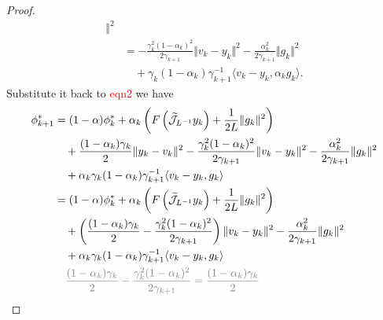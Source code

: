 \documentclass[12pt]{article}
\begin{document}
\begin{proof}
\begin{align*}
            \Vert^2
            \\
            &= 
            -\frac{\gamma_k^2 (1 - \alpha_k)^2}{2 \gamma_{k + 1}} 
            \Vert v_k - y_k\Vert^2 - 
            \frac{\alpha_k^2}{2 \gamma_{k + 1}} \Vert g_k\Vert^2
            \\&\quad 
                + 
                \gamma_k(1 - \alpha_k)\gamma_{k + 1}^{-1} \langle v_k - y_k, \alpha_k g_k\rangle. 
        \end{align*}
        Substitute it back to \textcolor{red}{eqn2} we have 
        \begin{align*}
            \phi_{k + 1}^* &= 
            (1 - \alpha)\phi_k^* + 
            \alpha_k
            \left(
                F\left(\widetilde{\mathcal J}_{L^{-1}} y_k\right) + 
                \frac{1}{2L}\Vert g_k\Vert^2
            \right)
            \\
            &\quad 
            + \frac{(1 - \alpha_k)\gamma_k}{2}\Vert y_k - v_k\Vert^2
            - \frac{\gamma_k^2(1 - \alpha_k)^2}{2\gamma_{k + 1}}\Vert v_k - y_k\Vert^2
            - \frac{\alpha_k^2}{2\gamma_{k + 1}}\Vert g_k\Vert^2
            \\
            &\quad 
            + \alpha_k\gamma_k(1 - \alpha_k)\gamma_{k + 1}^{-1}\langle v_k -y_k, g_k\rangle
            \\
            &= 
                (1 - \alpha)\phi_k^* + 
                \alpha_k
                \left(
                    F\left(\widetilde{\mathcal J}_{L^{-1}} y_k\right) + 
                    \frac{1}{2L}\Vert g_k\Vert^2
                \right)
                \\
                &\quad 
                + 
                \left(
                    \frac{(1 - \alpha_k)\gamma_k}{2}
                    - 
                    \frac{\gamma_k^2(1 - \alpha_k)^2}{2\gamma_{k + 1}}
                \right)
                \Vert v_k - y_k\Vert^2
                - \frac{\alpha_k^2}{2\gamma_{k + 1}}\Vert g_k\Vert^2
                \\
                &\quad 
                + \alpha_k\gamma_k(1 - \alpha_k)\gamma_{k + 1}^{-1}\langle v_k -y_k, g_k\rangle
            \\
            & \quad 
            \textcolor{gray}{  
                \begin{aligned}
                    \frac{(1 - \alpha_k)\gamma_k}{2}
                    - 
                    \frac{\gamma_k^2(1 - \alpha_k)^2}{2\gamma_{k + 1}}   
                    &= 
                    \frac{(1 - \alpha_k)\gamma_k}{2}

\end{aligned}}
\end{align*}
\end{proof}
\end{document}
